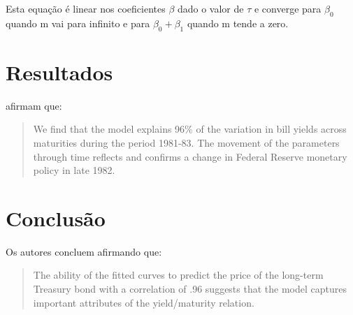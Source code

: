 \documentclass[a4paper, 11pt]{article}
\begin{document}
Esta equação é linear nos coeficientes $\beta$ dado o valor de $\tau$ e converge para $\beta_0$ quando m vai para infinito e para $\beta_0 + \beta_1$ quando m tende a zero.

\section{Resultados}
\citet{nelsonsiegel1987}  afirmam que:

\begin{quote}
 We find that the model explains 96\% of the  variation in bill yields across maturities during the period 1981-83. The movement of the parameters through time reflects and confirms a change in Federal Reserve monetary policy in late 1982. 
\end{quote}


\section{Conclusão}
Os autores concluem afirmando que:

\begin{quote}
The ability of the fitted curves to predict the price of the long-term Treasury bond with a correlation of .96 suggests that the model captures important attributes of the yield/maturity relation.
\end{quote}




\end{document}
